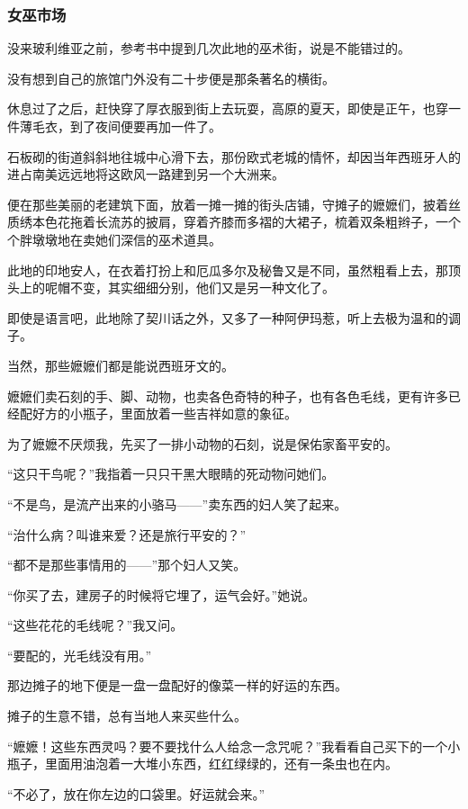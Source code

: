 \subsubsection*{女巫市场}
\par 没来玻利维亚之前，参考书中提到几次此地的巫术街，说是不能错过的。
\par 没有想到自己的旅馆门外没有二十步便是那条著名的横街。
\par 休息过了之后，赶快穿了厚衣服到街上去玩耍，高原的夏天，即使是正午，也穿一件薄毛衣，到了夜间便要再加一件了。
\par 石板砌的街道斜斜地往城中心滑下去，那份欧式老城的情怀，却因当年西班牙人的进占南美远远地将这欧风一路建到另一个大洲来。
\par 便在那些美丽的老建筑下面，放着一摊一摊的街头店铺，守摊子的嬷嬷们，披着丝质绣本色花拖着长流苏的披肩，穿着齐膝而多褶的大裙子，梳着双条粗辫子，一个个胖墩墩地在卖她们深信的巫术道具。
\par 此地的印地安人，在衣着打扮上和厄瓜多尔及秘鲁又是不同，虽然粗看上去，那顶头上的呢帽不变，其实细细分别，他们又是另一种文化了。
\par 即使是语言吧，此地除了契川话之外，又多了一种阿伊玛惹，听上去极为温和的调子。
\par 当然，那些嬷嬷们都是能说西班牙文的。
\par 嬷嬷们卖石刻的手、脚、动物，也卖各色奇特的种子，也有各色毛线，更有许多已经配好方的小瓶子，里面放着一些吉祥如意的象征。
\par 为了嬷嬷不厌烦我，先买了一排小动物的石刻，说是保佑家畜平安的。
\par “这只干鸟呢？”我指着一只只干黑大眼睛的死动物问她们。
\par “不是鸟，是流产出来的小骆马——”卖东西的妇人笑了起来。
\par “治什么病？叫谁来爱？还是旅行平安的？”
\par “都不是那些事情用的——”那个妇人又笑。
\par “你买了去，建房子的时候将它埋了，运气会好。”她说。
\par “这些花花的毛线呢？”我又问。
\par “要配的，光毛线没有用。”
\par 那边摊子的地下便是一盘一盘配好的像菜一样的好运的东西。
\par 摊子的生意不错，总有当地人来买些什么。
\par “嬷嬷！这些东西灵吗？要不要找什么人给念一念咒呢？”我看看自己买下的一个小瓶子，里面用油泡着一大堆小东西，红红绿绿的，还有一条虫也在内。
\par “不必了，放在你左边的口袋里。好运就会来。”
